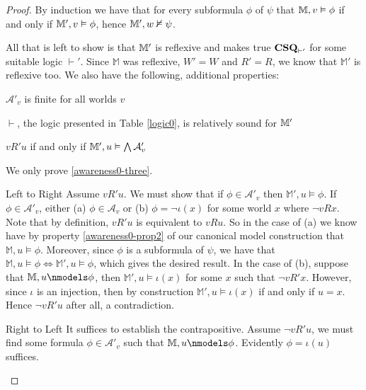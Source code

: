 \begin{proof}
  By induction we have that for every subformula $\phi$ of $\psi$ that
  $\mathbbm{M}, v \vDash \phi$ if and only if $\mathbbm{M}', v \vDash \phi$,
  hence $\mathbbm{M}', w \nvDash \psi$.
    
  All that is left to show is that $\mathbbm{M}'$ is reflexive and
  makes true $\text{\tmtextbf{CSQ}}_{\vdash'}$ for some suitable logic $\vdash'$.  Since $\mathbb{M}$ was reflexive, $W' =
  W$ and $R' = R$, we know that $\mathbb{M}'$ is reflexive too.  We
  also have the following, additional properties:
  \begin{enumerateroman}
    \item \label{awareness0-one} $\mathcal{A}'_v$ is finite for all worlds $v$
    \item \label{awareness0-two} $\vdash$, the logic presented in Table \ref{logic0}, is
      relatively sound for $\mathbbm{M}'$
    \item\label{awareness0-three}  $v R' u$ if and only if $\mathbbm{M}', u \vDash \bigwedge
    \mathcal{A}'_v$
  \end{enumerateroman}

   We only prove \eqref{awareness0-three}.

  \begin{descriptiondash}
   \item[Left to Right]  Assume $v R' u$. We must show that if
   $\phi \in \mathcal{A}'_v$ then $\mathbb{M}', u \models \phi$.  If
   $\phi \in \mathcal{A}'_v$, either (a) $\phi \in \mathcal{A}_v$ or
   (b) $\phi = \neg \iota(x)$ for some world $x$ where $\neg v R x$. Note
   that by definition, $v R' u$ is equivalent to $v R u$.  So in the
   case of (a) we know have by property \eqref{awareness0-prop2} of
   our canonical model construction that $\mathbb{M}, u \models \phi$.
   Moreover, since $\phi$ is a subformula of $\psi$, we have that
   $\mathbb{M},u \models \phi \iff \mathbb{M}',u \models \phi$, which
   gives the desired result.  In the case of (b),
   suppose that $\mathbb{M},u \nmodels \phi$, then $\mathbb{M}',u
   \models \iota(x)$ for some $x$ such that $\neg v R' x$.  However,
   since $\iota$ is an injection, then by construction $\mathbb{M}',u
   \models \iota(x)$ if and only if $u = x$.  Hence $\neg v R' u$ after
   all, a contradiction.
  
   \item[Right to Left] It suffices to establish the contrapositive.  Assume $\neg v R' u$,
   we must find some formula $\phi \in \mathcal{A}'_v$ such that
   $\mathbb{M}, u \nmodels \phi$.  Evidently $\phi = \iota(u)$ suffices.
 \end{descriptiondash}
  

\end{proof}
